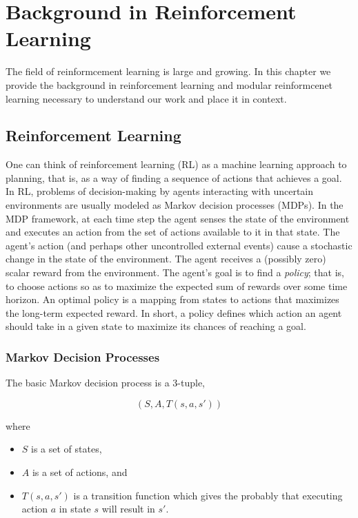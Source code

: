 \chapter{Background in Reinforcement Learning}\label{ch:rl}

The field of reinformcement learning is large and growing. In this chapter we provide the background in reinforcement learning and modular reinformcenet learning necessary to understand our work and place it in context.

\section{Reinforcement Learning}

One can think of reinforcement learning (RL) \cite{sutton1998reinforcement,kaelbling1996reinforcement} as a machine learning approach to planning, that is, as a way of finding a sequence of actions that achieves a goal. In RL, problems of decision-making by agents interacting with uncertain environments are usually modeled as Markov decision processes (MDPs). In the MDP framework, at each time step the agent senses the state of the environment and executes an action from the set of actions available to it in that state. The agent's action (and perhaps other uncontrolled external events) cause a stochastic change in the state of the environment. The agent receives a (possibly zero) scalar reward from the environment. The agent's goal is to find a {\it policy}; that is, to choose actions so as to maximize the expected sum of rewards over some time horizon. An optimal policy is a mapping from states to actions that maximizes the long-term expected reward.  In short, a policy defines which action an agent should take in a given state to maximize its chances of reaching a goal.

\subsection{Markov Decision Processes}

The basic Markov decision process is a 3-tuple,

\[
(S, A, T(s, a, s'))
\]

where

\begin{itemize}
\item $S$ is a set of states,
\item $A$ is a set of actions, and
\item $T(s, a, s')$ is a transition function which gives the probably that executing action $a$ in state $s$ will result in $s'$.
\end{itemize}


